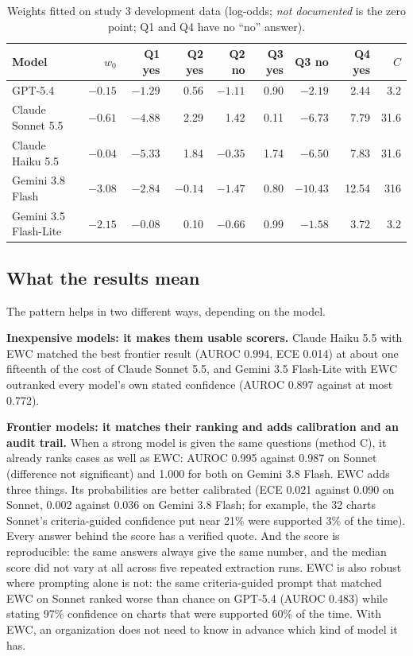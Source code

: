 \documentclass[10pt,letterpaper]{article}
\newcommand{\nd}{\textit{not documented}}
\begin{document}
\begin{table}[!htbp]
\centering\small
\caption{Weights fitted on study 3 development data (log-odds; \nd{} is the zero point; Q1 and Q4 have no ``no'' answer).}\label{tab:weights}
\begin{tabular}{@{}lrrrrrrrr@{}}
\toprule
Model & $w_0$ & Q1 yes & Q2 yes & Q2 no & Q3 yes & Q3 no & Q4 yes & $C$ \\
\midrule
GPT-5.4 & $-0.15$ & $-1.29$ & 0.56 & $-1.11$ & 0.90 & $-2.19$ & 2.44 & 3.2 \\
Claude Sonnet 5.5 & $-0.61$ & $-4.88$ & 2.29 & 1.42 & 0.11 & $-6.73$ & 7.79 & 31.6 \\
Claude Haiku 5.5 & $-0.04$ & $-5.33$ & 1.84 & $-0.35$ & 1.74 & $-6.50$ & 7.83 & 31.6 \\
Gemini 3.8 Flash & $-3.08$ & $-2.84$ & $-0.14$ & $-1.47$ & 0.80 & $-10.43$ & 12.54 & 316 \\
Gemini 3.5 Flash-Lite & $-2.15$ & $-0.08$ & 0.10 & $-0.66$ & 0.99 & $-1.58$ & 3.72 & 3.2 \\
\bottomrule
\end{tabular}
\end{table}

\FloatBarrier
\subsection{What the results mean}\label{sec:meaning}

The pattern helps in two different ways, depending on the model.

\textbf{Inexpensive models: it makes them usable scorers.} Claude Haiku 5.5 with EWC matched the best frontier result (AUROC 0.994, ECE 0.014) at about one fifteenth of the cost of Claude Sonnet 5.5, and Gemini 3.5 Flash-Lite with EWC outranked every model's own stated confidence (AUROC 0.897 against at most 0.772).

\textbf{Frontier models: it matches their ranking and adds calibration and an audit trail.} When a strong model is given the same questions (method C), it already ranks cases as well as EWC: AUROC 0.995 against 0.987 on Sonnet (difference not significant) and 1.000 for both on Gemini 3.8 Flash. EWC adds three things. Its probabilities are better calibrated (ECE 0.021 against 0.090 on Sonnet, 0.002 against 0.036 on Gemini 3.8 Flash; for example, the 32 charts Sonnet's criteria-guided confidence put near 21\% were supported 3\% of the time). Every answer behind the score has a verified quote. And the score is reproducible: the same answers always give the same number, and the median score did not vary at all across five repeated extraction runs. EWC is also robust where prompting alone is not: the same criteria-guided prompt that matched EWC on Sonnet ranked worse than chance on GPT-5.4 (AUROC 0.483) while stating 97\% confidence on charts that were supported 60\% of the time. With EWC, an organization does not need to know in advance which kind of model it has.
\end{document}
